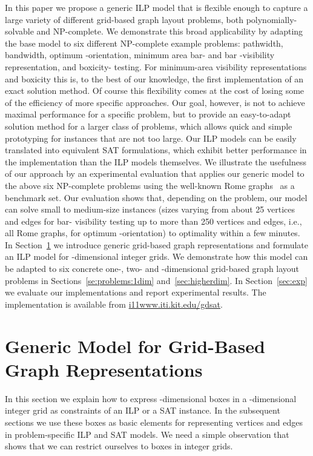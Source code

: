 \documentclass[runningheads]{llncs}
\newcounter{constr}
\begin{document}
In this paper we propose a generic ILP model that is flexible enough
to capture a large variety of different grid-based graph layout
problems, both polynomially-solvable and NP-complete. We demonstrate
this broad applicability by adapting the base model to six different
NP-complete example problems: pathwidth, bandwidth, optimum
-orientation, minimum area bar- and bar -visibility representation, and boxicity- testing. 
For minimum-area visibility representations and boxicity this is, to the best of our knowledge, the first implementation of an exact solution
method.
Of course this flexibility comes at the cost of losing some of the
efficiency of more specific approaches. Our goal, however, is not to
achieve maximal performance for a specific problem, but to provide an
easy-to-adapt solution method for a larger class of problems, which
allows quick and simple prototyping for instances that are not too
large. Our ILP models can be easily translated into equivalent SAT
formulations, which exhibit better performance in the implementation
than the ILP models themselves. We illustrate the usefulness of our
approach by an experimental evaluation that applies our generic model
to the above six NP-complete problems using the well-known Rome
graphs~\cite{rome} as a benchmark set. Our evaluation shows that,
depending on the problem, our model can solve small to medium-size
instances (sizes varying from about 25 vertices and edges for bar-
visibility testing up to more than 250 vertices and edges, i.e., all
Rome graphs, for optimum -orientation) to optimality within a few
minutes. 
In Section~\ref{sec:genericmodel} we introduce generic grid-based
graph representations and formulate an ILP model for -dimensional
integer grids. We demonstrate how this model can be adapted to six
concrete one-, two- and -dimensional grid-based graph layout
problems in Sections~\ref{se:problems:1dim} and~\ref{sec:higherdim}.
In Section~\ref{sec:exp} we evaluate our implementations and report
experimental results. The implementation is available from
\url{i11www.iti.kit.edu/gdsat}. 
 

\section{Generic Model for Grid-Based Graph Representations}\label{sec:genericmodel}

In this section we explain how to express -dimensional boxes in a
-dimensional integer grid as constraints of an ILP or a SAT
instance. In the subsequent sections we use these boxes as
basic elements for representing vertices and edges in problem-specific ILP and SAT models.
We need a simple observation that shows that we can restrict ourselves
to boxes in integer grids.
\end{document}

